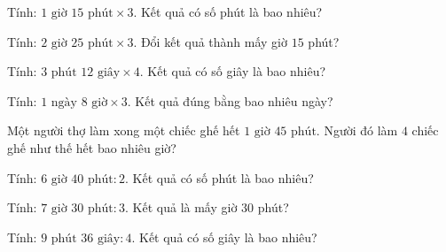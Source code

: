 
\begin{ex}
  Tính: $1\text{ giờ } 15\text{ phút} \times 3$. Kết quả có số phút là bao nhiêu?
\end{ex}

\begin{ex}
  Tính: $2\text{ giờ } 25\text{ phút} \times 3$. Đổi kết quả thành mấy giờ $15$ phút?
\end{ex}

\begin{ex}
  Tính: $3\text{ phút } 12\text{ giây} \times 4$. Kết quả có số giây là bao nhiêu?
\end{ex}

\begin{ex}
  Tính: $1\text{ ngày } 8\text{ giờ} \times 3$. Kết quả đúng bằng bao nhiêu ngày?
\end{ex}

\begin{ex}
  Một người thợ làm xong một chiếc ghế hết $1\text{ giờ } 45\text{ phút}$. Người đó làm $4$ chiếc ghế như thế hết bao nhiêu giờ?
\end{ex}

\begin{ex}
  Tính: $6\text{ giờ } 40\text{ phút} : 2$. Kết quả có số phút là bao nhiêu?
\end{ex}

\begin{ex}
  Tính: $7\text{ giờ } 30\text{ phút} : 3$. Kết quả là mấy giờ $30$ phút?
\end{ex}

\begin{ex}
  Tính: $9\text{ phút } 36\text{ giây} : 4$. Kết quả có số giây là bao nhiêu?
\end{ex}

